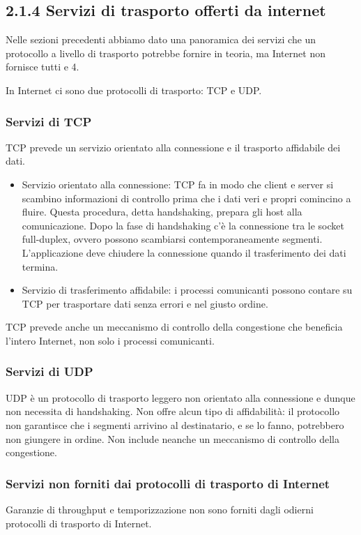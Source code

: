 \documentclass{book}
\begin{document}
\subsection*{2.1.4 Servizi di trasporto offerti da internet}
Nelle sezioni precedenti abbiamo dato una panoramica dei servizi che un protocollo a livello di trasporto potrebbe fornire in teoria, ma Internet non fornisce tutti e 4.

In Internet ci sono due protocolli di trasporto: TCP e UDP.

\subsubsection*{Servizi di TCP}
TCP prevede un servizio orientato alla connessione e il trasporto affidabile dei dati.

\begin{itemize}
	\item Servizio orientato alla connessione: TCP fa in modo che client e server si scambino informazioni di controllo prima che i dati veri e propri comincino a fluire. Questa procedura, detta handshaking, prepara gli host alla comunicazione. Dopo la fase di handshaking c'è la connessione tra le socket full-duplex, ovvero possono scambiarsi contemporaneamente segmenti. L'applicazione deve chiudere la connessione quando il trasferimento dei dati termina.
	
	\item Servizio di trasferimento affidabile: i processi comunicanti possono contare su TCP per trasportare dati senza errori e nel giusto ordine.
\end{itemize}

TCP prevede anche un meccanismo di controllo della congestione che beneficia l'intero Internet, non solo i processi comunicanti.

\subsubsection*{Servizi di UDP}
UDP è un protocollo di trasporto leggero non orientato alla connessione e dunque non necessita di handshaking. Non offre alcun tipo di affidabilità: il protocollo non garantisce che i segmenti arrivino al destinatario, e se lo fanno, potrebbero non giungere in ordine. Non include neanche un meccanismo di controllo della congestione.

\subsubsection*{Servizi non forniti dai protocolli di trasporto di Internet}
Garanzie di throughput e temporizzazione non sono forniti dagli odierni protocolli di trasporto di Internet.
\end{document}
